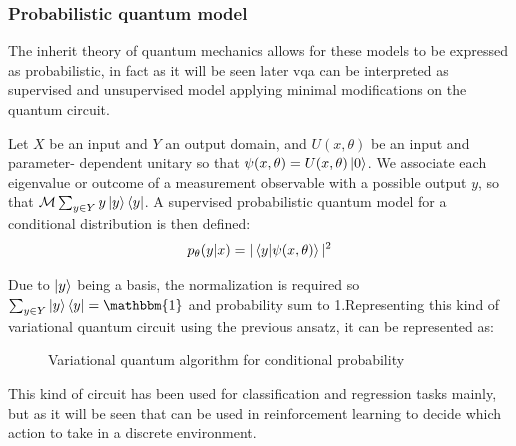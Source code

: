 \subsubsection{Probabilistic quantum model}
The inherit theory of quantum mechanics allows for these models to be expressed as probabilistic, in fact as it will be seen later \acrfull{vqa} can be interpreted as supervised and unsupervised model applying minimal modifications on the quantum circuit.
\begin{mydef}
	Let $X$ be an input and $Y$ an output domain, and $U(x, \theta)$ be an input and parameter-
	dependent unitary so that $\psi(x, \theta) = U(x, \theta)\ket{0}$. We associate each eigenvalue	or outcome of a measurement observable with a possible output $y$, so that $\mathcal{M} \sum_{y \in Y} y \ket{y} \bra{y}$. A supervised probabilistic quantum model for a conditional distribution is then defined:
	\begin{equation}
		p_\theta(y|x) = |\braket{y|\psi(x, \theta)}|^2
	\end{equation}
\end{mydef}
Due to ${\ket{y}}$ being a basis, the normalization is required so $\sum_{y \in Y} \ket{y} \bra{y} = \mathbbm{1}$ and probability sum to 1.Representing this kind of variational quantum circuit using the previous ansatz, it can be represented as:
\begin{center}
	\begin{figure}[!h]
		\centering
		\caption{Variational quantum algorithm for conditional probability}
		\label{vqa conditional}
	\end{figure}
\end{center}
This kind of circuit has been used for classification and regression tasks mainly, but as it will be seen that can be used in reinforcement learning to decide which action to take in a discrete environment.\\
